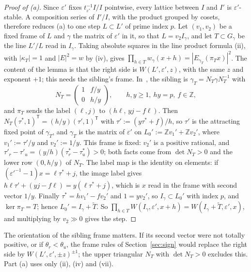 \documentclass[11pt]{amsart}
\numberwithin{equation}{section}
\theoremstyle{plain}
\theoremstyle{definition}
\theoremstyle{remark}
\begin{document}
\begin{proof}[Proof of (a)]
Since \(\varepsilon'\) fixes \(t_{\varepsilon'}^{-1}I/I\) pointwise, every lattice between \(I\) and \(I'\) is \(\varepsilon'\)-stable. A composition series of \(I'/I\), with the product grouped by cosets, therefore reduces (a) to one step \(L\subset L'\) of prime index \(p\). Let \((v_1,v_2)\) be a fixed frame of \(L\) and \(\gamma\) the matrix of \(\varepsilon'\) in it, so that \(L=v_2I_\gamma\), and let \(T\subset G_\gamma\) be the line \(L'/L\) read in \(I_\gamma\). Taking absolute squares in the line product formula (ii), with \(|\kappa_T|=1\) and \(|E|^2=w\) by (iv), gives \(\prod_{h\in T}w_\gamma(x+h)=|E_{\gamma_T}(\pi_Tx)|^2\). The content of the lemma is that the right side is \(W(L',\varepsilon',z)\), with the same \(z\) and exponent \(+1\); this needs the sibling's frame. In~\cite[Prop.~9]{RW}, the sibling is \(\gamma_T=N_T\gamma N_T^{-1}\) with
\[N_T=\begin{pmatrix}1&f/y\\0&h/y\end{pmatrix},\qquad h,y\ge1,\ hy=p,\ f\in\mathbb Z,\]
and \(\pi_T\) sends the label \((\ell,j)\) to \((h\ell,\,yj-f\ell)\). Then \(N_T(\tau^*,1)^{\mathsf T}=(h/y)(\tau',1)^{\mathsf T}\) with \(\tau':=(y\tau^*+f)/h\), so \(\tau'\) is the attracting fixed point of \(\gamma_T\), and \(\gamma_T\) is the matrix of \(\varepsilon'\) on \(L_0':=\mathbb Zv_1'+\mathbb Zv_2'\), where \(v_1':=\tau'/y\) and \(v_2':=1/y\). This frame is fixed: \(v_2'\) is a positive rational, and \(\tau'_r-\tau'_u=(y/h)(\tau^*_r-\tau^*_u)>0\); both facts come from \(\det N_T>0\) and the lower row \((0,h/y)\) of \(N_T\). The label map is the identity on elements: if \((\varepsilon'^{-1}-1)x=\ell\tau^*+j\), the image label gives \(h\ell\tau'+(yj-f\ell)=y(\ell\tau^*+j)\), which is \(x\) read in the frame with second vector \(1/y\). Finally \(\tau^*=hv_1'-fv_2'\) and \(1=yv_2'\), so \(I_\gamma\subset L_0'\) with index \(p\), and \(\ker\pi_T=T\); hence \(L_0'=I_\gamma+\widetilde T\). So \(\prod_{h\in T}W(I_\gamma,\varepsilon',x+h)=W(I_\gamma+\widetilde T,\varepsilon',x)\), and multiplying by \(v_2\gg0\) gives the step.
\end{proof}

The orientation of the sibling frame matters. If its second vector were not totally positive, or if \(\theta_r<\theta_u\), the frame rules of Section~\ref{sec:sign} would replace the right side by \(W(L',\varepsilon',\pm z)^{\pm1}\); the upper triangular \(N_T\) with \(\det N_T>0\) excludes this. Part (a) uses only (ii), (iv) and (vii).
\end{document}

